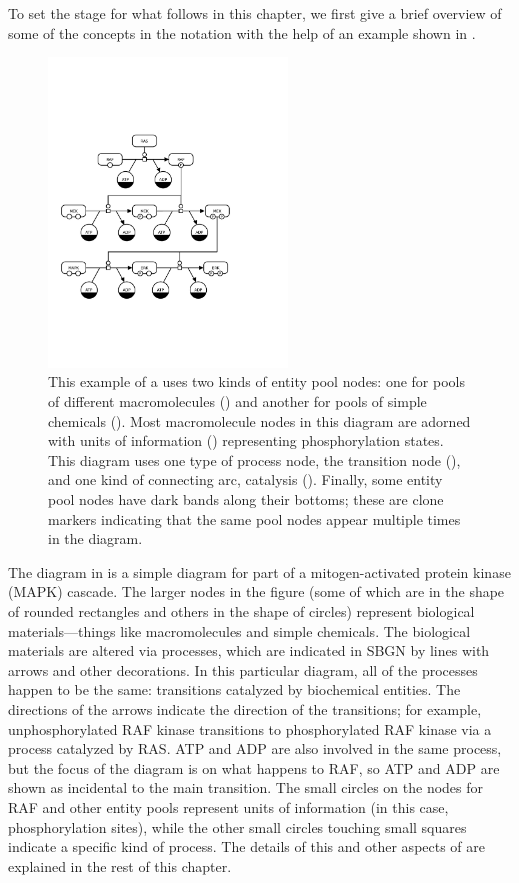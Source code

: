 
To set the stage for what follows in this chapter, we first give a brief overview of some of the concepts in the \PD notation with the help of an example shown in .

\begin{figure}[htb]
  \centering
  \includegraphics[width = 2.5in, trim = 1.5in 2.5in 3.15in 2.9in]{examples/MAPK-only}
  \caption{This example of a \PD uses two kinds of entity pool nodes: one
    for pools of different macromolecules () and
    another for pools of simple chemicals ().  Most
    macromolecule nodes in this diagram are adorned with units of
    information () representing phosphorylation states.
    This diagram uses one type of process node, the transition node
    (), and one kind of connecting arc, catalysis
    ().  Finally, some entity pool nodes have dark bands
    along their bottoms; these are clone markers indicating that the same
    pool nodes appear multiple times in the diagram.}
  \label{fig:eg1}
\end{figure}

The diagram in  is a simple diagram for part of a mitogen-activated protein kinase (MAPK) cascade.  The larger nodes in the figure (some of which are in the shape of rounded rectangles and others in the shape of circles) represent biological materials---things like macromolecules and simple chemicals.  The biological materials are altered via processes, which are indicated in SBGN by lines with arrows and other decorations.  In this particular diagram, all of the processes happen to be the same: transitions catalyzed by biochemical entities.  The directions of the arrows indicate the direction of the transitions; for example, unphosphorylated RAF kinase transitions to phosphorylated RAF kinase via a process catalyzed by RAS.  ATP and ADP are also involved in the same process, but the focus of the diagram is on what happens to RAF, so ATP and ADP are shown as incidental to the main transition.  The small circles on the nodes for RAF and other entity pools represent units of information (in this case, phosphorylation sites), while the other small circles touching small squares indicate a specific kind of process.  The details of this and other aspects of \PD are explained in the rest of this chapter.

